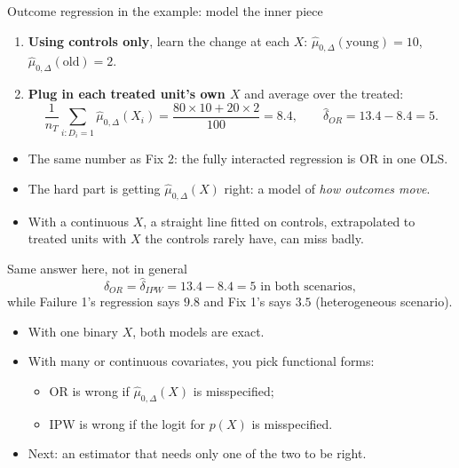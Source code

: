 \documentclass[
  11pt,
  ignorenonframetext,
  aspectratio=169,
]{beamer}
\providecommand{\tightlist}{%
  \setlength{\itemsep}{0pt}\setlength{\parskip}{0pt}}
\begin{document}
\begin{frame}{Outcome regression in the example: model the inner piece}
\protect{}\label{outcome-regression-in-the-example-model-the-inner-piece}
\begin{enumerate}
\tightlist
\item
  \textbf{Using controls only}, learn the change at each \(X\):
  \(\hat\mu_{0,\Delta}(\text{young}) = 10\),
  \(\hat\mu_{0,\Delta}(\text{old}) = 2\).
\item
  \textbf{Plug in each treated unit's own \(X\)} and average over the
  treated: \[
  \frac{1}{n_T}\sum_{i: D_i = 1} \hat\mu_{0,\Delta}(X_i) = \frac{80 \times 10 + 20 \times 2}{100} = 8.4, \qquad \hat\delta_{OR} = 13.4 - 8.4 = 5 .
  \]
\end{enumerate}

\vspace{0.4em}

\begin{itemize}
\tightlist
\item
  The same number as Fix 2: the fully interacted regression is OR in one
  OLS.
\item
  The hard part is getting \(\hat\mu_{0,\Delta}(X)\) right: a model of
  \emph{how outcomes move}.
\item
  With a continuous \(X\), a straight line fitted on controls,
  extrapolated to treated units with \(X\) the controls rarely have, can
  miss badly.
\end{itemize}
\end{frame}

\begin{frame}{Same answer here, not in general}
\protect{}\label{same-answer-here-not-in-general}
\[
\hat\delta_{OR} = \hat\delta_{IPW} = 13.4 - 8.4 = 5 \text{ in both scenarios},
\] while Failure 1's regression says \(9.8\) and Fix 1's says \(3.5\)
(heterogeneous scenario).

\begin{itemize}
\tightlist
\item
  With one binary \(X\), both models are exact.
\item
  With many or continuous covariates, you pick functional forms:

  \begin{itemize}
  \tightlist
  \item
    OR is wrong if \(\hat\mu_{0,\Delta}(X)\) is misspecified;
  \item
    IPW is wrong if the logit for \(p(X)\) is misspecified.
  \end{itemize}
\item
  Next: an estimator that needs only one of the two to be right.
\end{itemize}
\end{frame}
\end{document}
